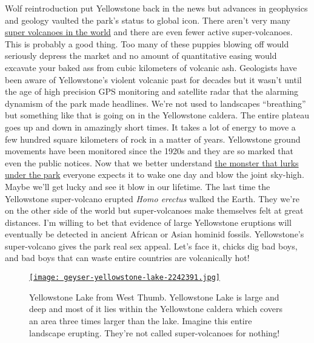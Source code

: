 Wolf reintroduction put Yellowstone back in the news but advances in
geophysics and geology vaulted the park's status to global icon. There
aren't very many
\href{http://wiki.answers.com/Q/How\_many\_super\_volcanoes\_are\_there\_all\_together\_in\_the\_world}{super
volcanoes in the world} and there are even fewer active super-volcanoes.
This is probably a good thing. Too many of these puppies blowing off
would seriously depress the market and no amount of quantitative easing
would excavate your baked ass from cubic kilometers of volcanic ash.
Geologists have been aware of Yellowstone's violent volcanic past for
decades but it wasn't until the age of high precision GPS monitoring and
satellite radar that the alarming dynamism of the park made headlines.
We're not used to landscapes ``breathing'' but something like that is
going on in the Yellowstone caldera. The entire plateau goes up and down
in amazingly short times. It takes a lot of energy to move a few hundred
square kilometers of rock in a matter of years. Yellowstone ground
movements have been monitored since the 1920s and they are so marked
that even the public notices. Now that we better understand
\href{http://ngm.nationalgeographic.com/2009/08/yellowstone/yellowstone-interactive}{the
monster that lurks under the park} everyone expects it to wake one day
and blow the joint sky-high. Maybe we'll get lucky and see it blow in
our lifetime. The last time the Yellowstone super-volcano erupted
\emph{Homo erectus} walked the Earth. They we're on the other side of
the world but super-volcanoes make themselves felt at great distances.
I'm willing to bet that evidence of large Yellowstone eruptions will
eventually be detected in ancient African or Asian hominid fossils.
Yellowstone's super-volcano gives the park real sex appeal. Let's face
it, chicks dig bad boys, and bad boys that can waste entire countries
are volcanically hot!



\begin{SCfigure}
\centering
\centering
\href{http://conceptcontrol.smugmug.com/Trips/USA-and-Canada/North-Western/i-6R2qMdw/A}{\texttt{[image: geyser-yellowstone-lake-2242391.jpg]}}
\caption[Yellowstone Lake from West Thumb.]{Yellowstone Lake from West Thumb. Yellowstone Lake is large and deep and
most of it lies within the Yellowstone caldera which covers an area
three times larger than the lake. Imagine this entire landscape
erupting. They're not called super-volcanoes for nothing!}
\label{fig:4186X4}
\end{SCfigure}


